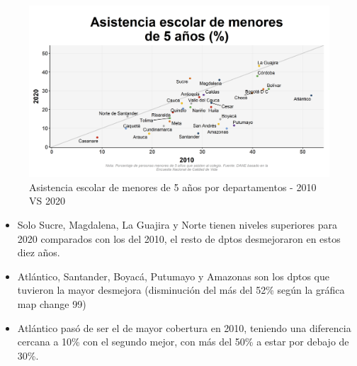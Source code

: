     \begin{figure}[H]
        \caption{Asistencia escolar de menores de 5 años por departamentos - 2010 VS 2020 \label{map_result_2} }
        \begin{center}
        \includegraphics[width=\textwidth,keepaspectratio]{img/var_99_scatter_time.png}
        \end{center}
    \end{figure}
            \begin{itemize}
                \item Solo Sucre, Magdalena, La Guajira y Norte tienen niveles superiores para 2020 comparados con los del 2010, el resto de dptos desmejoraron en estos diez años.
                \item Atlántico, Santander, Boyacá, Putumayo y Amazonas son los dptos que tuvieron la mayor desmejora (disminución del más del 52\% según la gráfica map change 99)
                \item Atlántico pasó de ser el de mayor cobertura en 2010, teniendo una diferencia cercana a 10\% con el segundo mejor, con más del 50\% a estar por debajo de 30\%.
                \end{itemize}

